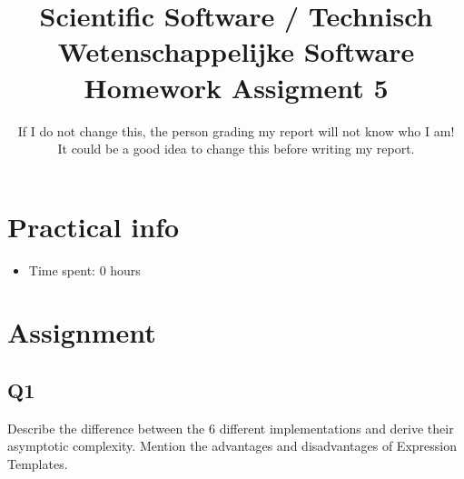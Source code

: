 \documentclass[a4paper]{article}
\title{\large Scientific Software / Technisch Wetenschappelijke Software \\ Homework Assigment 5}
\author{If I do not change this, the person grading my report will not know who I am!\\ It could be a good idea to change this before writing my report.}
\date{}
\newcommand{\answer}[1]{\vspace{-0.75em}\begin{framed} #1 \end{framed}\vspace{-0.75em}}
\begin{document}
\maketitle
\section*{Practical info}
\begin{itemize}
\item Time spent: 0 hours %
\end{itemize}

\section*{Assignment}
\subsection*{Q1}
Describe the difference between the 6 different implementations and derive their asymptotic complexity. Mention the advantages and disadvantages of Expression Templates.

%	
%	
\end{document}
